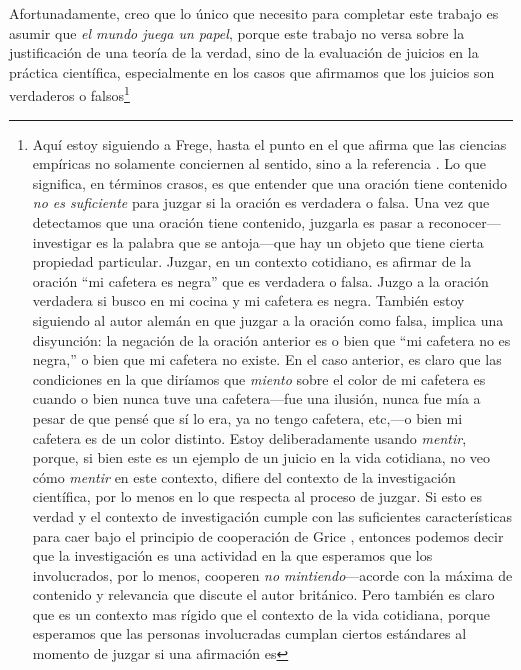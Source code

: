 Afortunadamente, creo que lo único que necesito para completar este trabajo es asumir
que \textit{el mundo juega un papel}, porque este trabajo no versa sobre la
justificación de una teoría de la verdad, sino de la evaluación de juicios en la
práctica científica, especialmente en los casos que afirmamos que los juicios son
verdaderos o falsos\footnote{Aquí estoy siguiendo a Frege, hasta el punto en el que
afirma que las ciencias empíricas no solamente conciernen al sentido, sino a la
referencia \cite{frege1918thought}. Lo que significa, en términos crasos, es que entender que una
oración tiene contenido \textit{no es suficiente} para juzgar si la oración es
verdadera o falsa. Una vez que detectamos que una oración tiene contenido, juzgarla
es pasar a reconocer---investigar es la palabra que se antoja---que hay un objeto que tiene cierta propiedad particular. Juzgar, en un contexto cotidiano, es afirmar
de la oración ``mi cafetera es negra'' que es verdadera o falsa. Juzgo a la oración
verdadera si busco en mi cocina y mi cafetera es negra. También estoy siguiendo al
autor alemán en que juzgar a la oración como falsa, implica una disyunción: la
negación de la oración anterior es o bien que ``mi cafetera no es negra,'' o bien que
mi cafetera no existe. En el caso anterior, es claro que las condiciones en la que
diríamos que \textit{miento} sobre el color de mi cafetera es cuando o bien nunca
tuve una cafetera---fue una ilusión, nunca fue mía a pesar de que pensé que sí lo
era, ya no tengo cafetera, etc,---o bien mi cafetera es de un color distinto. Estoy
deliberadamente usando \textit{mentir}, porque, si bien este es un ejemplo de un
juicio en la vida cotidiana, no veo cómo \textit{mentir} en este contexto, difiere del contexto de la investigación científica, por lo menos en lo que respecta al proceso de juzgar. Si esto es verdad y el contexto de investigación cumple con las suficientes características para caer bajo el principio de cooperación de Grice \parencite{}, entonces podemos decir que la investigación es una actividad en
la que esperamos que los involucrados, por lo menos, cooperen \textit{no mintiendo}---acorde con
la máxima de contenido y relevancia que discute el autor británico. Pero también es claro que es un contexto mas
rígido que el contexto de la vida cotidiana, porque esperamos que las personas
involucradas cumplan ciertos estándares al momento de juzgar si una afirmación es
}
